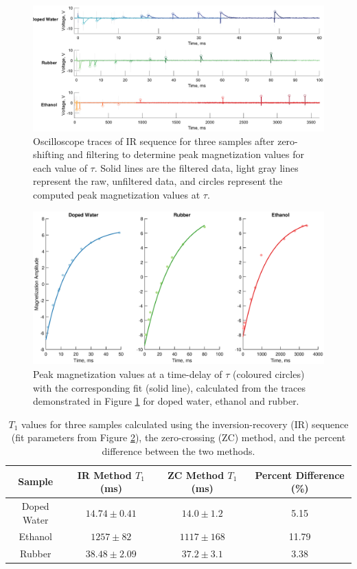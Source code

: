 \begin{figure}[H]
    \centering
    \includegraphics[width=\textwidth]{figures/B4/B4_1.eps}
    \caption{Oscilloscope traces of IR sequence for three samples after zero-shifting and filtering to determine peak magnetization values for each value of $\tau$. Solid lines are the filtered data, light gray lines represent the raw, unfiltered data, and circles represent the computed peak magnetization values at $\tau$.}
    \label{fig:B4:timetraces}
\end{figure}

\begin{figure}[H]
    \centering
    \includegraphics[width=\textwidth]{figures/B4/B4_2.eps}
    \caption{Peak magnetization values at a time-delay of $\tau$ (coloured circles) with the corresponding fit (solid line), calculated from the traces demonstrated in Figure \ref{fig:B4:timetraces} for doped water, ethanol and rubber.}
    \label{fig:B4:expfit}
\end{figure}

\begin{table}[H]
    \centering
    \begin{tabular}{c|c|c|c}
    \toprule
    \textbf{Sample} & IR Method $T_1$ (ms) & ZC Method $T_1$ (ms) & Percent Difference (\%)\\ \midrule
        Doped Water &  $14.74 \pm 0.41$ & $14.0\pm1.2$ & 5.15 \\
        Ethanol &  $1257 \pm 82$ & $1117\pm168$ & 11.79 \\
        Rubber &  $38.48 \pm 2.09$ & $37.2\pm 3.1$ & 3.38 \\ \bottomrule
    \end{tabular}
    \caption{$T_1$ values for three samples calculated using the inversion-recovery (IR) sequence (fit parameters from Figure \ref{fig:B4:expfit}), the zero-crossing (ZC) method, and the percent difference between the two methods.}
    \label{tab:B4:T1vals}
\end{table}

